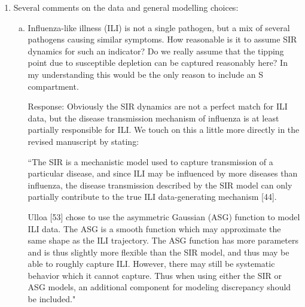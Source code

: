 \documentclass{article}
\newcommand{\spencer}[1]{{\color{red} Response: #1}}
\begin{document}
\begin{enumerate}[1.]
\begin{enumerate}[a.]
\item Also, it should be argued explicitly why this approach was chosen over a standard fully
Bayesian approach in the setting at hand. Was a fully Bayesian approach also explored? Which
difficulties were encountered?

\spencer{See response to comment 1b.}

\item Notably it would be helpful to comment on how this approach affects the uncertainty
propagation / overall quantification of forecast uncertainty.

\spencer{See response to comment 1b.}

\end{enumerate}


\item Several comments on the data and general modelling choices:

\begin{enumerate}[a.]
\item Influenza-like illness (ILI) is not a single pathogen, but a mix of several pathogens causing
similar symptoms. How reasonable is it to assume SIR dynamics for such an indicator? Do we
really assume that the tipping point due to susceptible depletion can be captured reasonably here? In
my understanding this would be the only reason to include an S compartment.

\spencer{Obviously the SIR dynamics are not a perfect match for ILI data, but
the disease transmission mechanism of influenza is at least partially 
responsible for ILI. We touch on this a little more directly in the revised 
manuscript by stating:

``The SIR is a mechanistic model used to capture transmission of a particular
disease, and since ILI may be influenced by more 
diseases than influenza, the disease transmission described by the SIR model
can only partially contribute to the true ILI data-generating mechanism
[44].

Ulloa [53]
chose to use the asymmetric Gaussian (ASG) function to model ILI data.
The ASG is a smooth function which may approximate the 
same shape as the ILI trajectory.
The ASG function has more parameters and is thus slightly more flexible than
the SIR model, and thus may be able to roughly capture ILI.
However, there may still be 
systematic behavior which it cannot capture. Thus when using either the SIR
or ASG models, an additional component for modeling discrepancy should be 
included."

}
\end{enumerate}
\end{enumerate}
\end{document}
